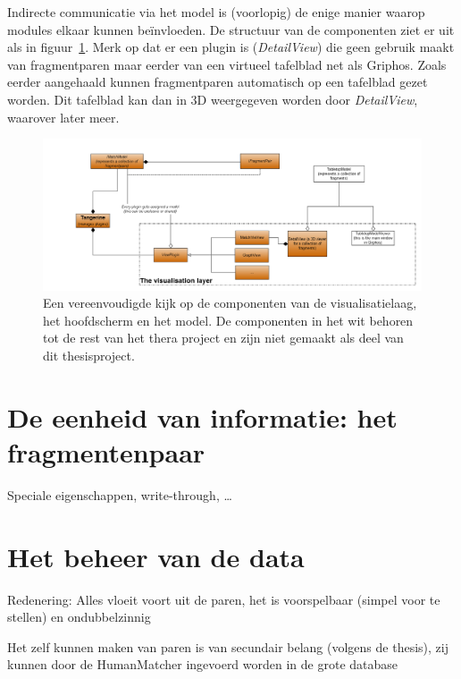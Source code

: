 Indirecte communicatie via het model is (voorlopig) de enige manier waarop modules elkaar kunnen be\"invloeden. De structuur van de componenten ziet er uit als in figuur~\ref{fig:visualizationlayer}. Merk op dat er een plugin is (\emph{DetailView}) die geen gebruik maakt van fragmentparen maar eerder van een virtueel tafelblad net als Griphos. Zoals eerder aangehaald kunnen fragmentparen automatisch op een tafelblad gezet worden. Dit tafelblad kan dan in 3D weergegeven worden door \emph{DetailView}, waarover later meer.

\begin{figure}[h]
	\begin{center}
		\includegraphics[width=1.0\columnwidth]{images/VisualizationExtract.png}
		\caption{Een vereenvoudigde kijk op de componenten van de visualisatielaag, het hoofdscherm en het model. De componenten in het wit behoren tot de rest van het thera project en zijn niet gemaakt als deel van dit thesisproject.}
		\label{fig:visualizationlayer}
	\end{center}
\end{figure}

\section{De eenheid van informatie: het fragmentenpaar}

Speciale eigenschappen, write-through, \ldots

\section{Het beheer van de data}

Redenering: Alles vloeit voort uit de paren, het is voorspelbaar (simpel voor te stellen) en ondubbelzinnig

Het zelf kunnen maken van paren is van secundair belang (volgens de thesis), zij kunnen door de HumanMatcher ingevoerd worden in de grote database

